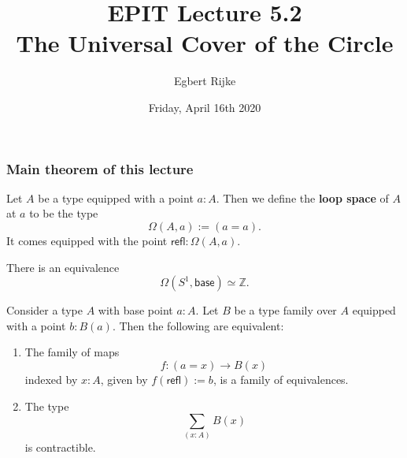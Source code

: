 \documentclass[handout]{beamer}
\title{EPIT Lecture 5.2\\ The Universal Cover of the Circle}
\author{Egbert Rijke}
\date{Friday, April 16th 2020}
\newcommand{\Z}{\mathbb{Z}}
\newcommand{\sphere}[1]{S^{#1}}
\newcommand{\refl}{\mathsf{refl}}
\newcommand{\baseS}{\mathsf{base}}
\begin{document}
\begin{frame}
  \maketitle
\end{frame}

\begin{frame}
  \frametitle{Main theorem of this lecture}
  \begin{definition}
    Let $A$ be a type equipped with a point $a:A$. Then we define the \textbf{loop space} of $A$ at $a$ to be the type
    \begin{equation*}
      \Omega(A,a):= (a=a).
    \end{equation*}
    It comes equipped with the point $\refl:\Omega(A,a)$.
  \end{definition}

  \begin{theorem}
    There is an equivalence
    \begin{equation*}
      \Omega(\sphere{1},\baseS)\simeq \Z.
    \end{equation*}
  \end{theorem}
\end{frame}

\begin{frame}
  \begin{theorem}
    Consider a type $A$ with base point $a:A$. Let $B$ be a type family over $A$ equipped with a point $b:B(a)$. Then the following are equivalent:
    \begin{enumerate}
    \item The family of maps
      \begin{equation*}
        f : (a=x)\to B(x)
      \end{equation*}
      indexed by $x:A$, given by $f(\refl):=b$, is a family of equivalences.
    \item The type
      \begin{equation*}
        \sum_{(x:A)}B(x)
      \end{equation*}
      is contractible.
    \end{enumerate}
  \end{theorem}
\end{frame}
\end{document}

